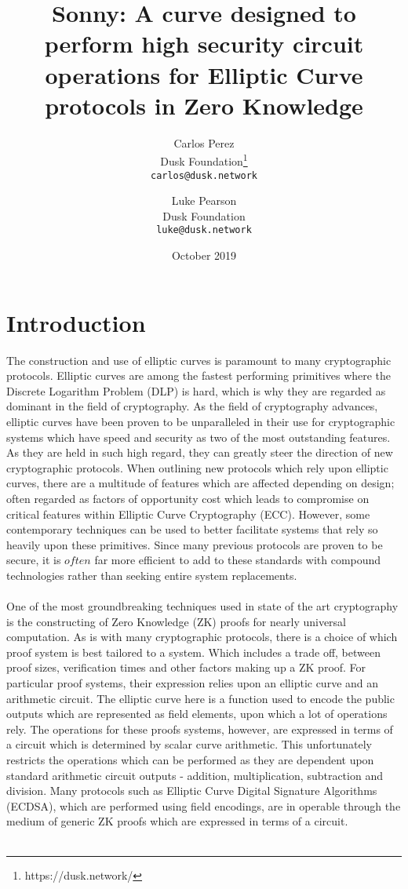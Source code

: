 \documentclass{article}
\title{Sonny: A curve designed to perform high security circuit operations for Elliptic Curve protocols in Zero Knowledge }
\author{
  Carlos Perez\\
  Dusk Foundation\footnote{https://dusk.network/}\\
  \texttt{carlos@dusk.network}
  \and
  Luke Pearson\\
  Dusk Foundation\\
  \texttt{luke@dusk.network}
}
\date{October 2019}
\begin{document}
\maketitle
\thispagestyle{empty}
\pagestyle{empty}

\begin{abstract}



\end{abstract}

\newpage

\tableofcontents

\newpage

\section{Introduction}
The construction and use of elliptic curves is paramount to many cryptographic protocols. Elliptic curves are among the fastest performing primitives where the Discrete Logarithm Problem (DLP) is hard, which is why they are regarded as dominant in the field of cryptography. As the field of cryptography advances, elliptic curves have been proven to be unparalleled in their use for cryptographic systems which have speed and security as two of the most outstanding features. As they are held in such high regard, they can greatly steer the direction of new cryptographic protocols. When outlining new protocols which rely upon elliptic curves, there are a multitude of features which are affected depending on design; often regarded as factors of opportunity cost which leads to compromise on critical features within Elliptic Curve Cryptography (ECC). However, some contemporary techniques can be used to better facilitate systems that rely so heavily upon these primitives. Since many previous protocols are proven to be secure, it is $often$ far more efficient to add to these standards with compound technologies rather than seeking entire system replacements. \\\\ One of the most groundbreaking techniques used in state of the art cryptography is the constructing of Zero Knowledge  (ZK) proofs for nearly universal computation. As is with many cryptographic protocols, there is a choice of which proof system is best tailored to a system. Which includes a trade off, between proof sizes, verification times and other factors making up a ZK proof.  For particular proof systems, their expression relies upon an elliptic curve and an arithmetic circuit. The elliptic curve here is a function used to encode the public outputs which are represented as field elements, upon which a lot of operations rely. The operations for these proofs systems, however, are expressed in terms of a circuit which is determined by scalar curve arithmetic. This unfortunately restricts the operations which can be performed as they are dependent upon standard arithmetic circuit outputs - addition, multiplication, subtraction and division. Many protocols such as Elliptic Curve Digital Signature Algorithms (ECDSA), which are performed using field encodings, are in operable through the medium of generic ZK proofs which are expressed in terms of a circuit. \\\\ 
\end{document}
